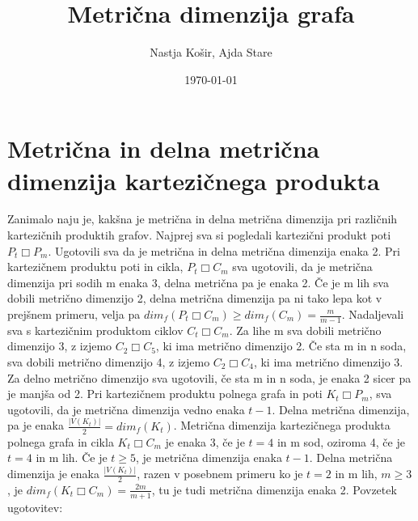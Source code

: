 \documentclass[a4paper]{report}
\title{Metrična dimenzija grafa }
\author{Nastja Košir, Ajda Stare}
\date{\today}
\begin{document}
	\section*{Metrična in delna metrična dimenzija kartezičnega produkta}
	
	Zanimalo naju je, kakšna je metrična in delna metrična dimenzija pri različnih kartezičnih produktih grafov. Najprej sva si pogledali kartezični produkt poti $P_{t}\Box P_{m}$. Ugotovili sva da je metrična in delna metrična dimenzija enaka 2. Pri kartezičnem produktu poti in cikla, $P_{t}\Box C_{m}$ sva ugotovili, da je metrična dimenzija pri  sodih m enaka 3, delna metrična pa je enaka 2. Če je m lih sva dobili metrično dimenzijo 2, delna metrična dimenzija pa ni tako lepa kot v prejšnem primeru, velja pa  $dim_{f}( P_{t}\Box C_{m})\ge dim_{f}(C_{m})= \frac{m}{m-1}$.
	Nadaljevali sva s kartezičnim produktom ciklov $C_{t}\Box C_{m}$. 
	Za lihe m sva dobili metrično dimenzijo 3, z izjemo $C_{2}\Box C_{5}$, ki ima metrično dimenzijo 2. Če sta m in n soda, sva dobili metrično dimenzijo 4, z izjemo $C_{2}\Box C_{4}$, ki ima metrično dimenzijo 3. Za delno metrično dimenzijo sva ugotovili, če sta m in n soda, je enaka 2 sicer pa je manjša od 2. Pri kartezičnem produktu polnega grafa in poti $K_{t}\Box P_{m}$, sva ugotovili, da je metrična dimenzija vedno enaka $t-1$. Delna metrična dimenzija, pa je enaka $\frac{|V(K_{t})|}{2} = dim_{f}(K_{t})$. Metrična dimenzija kartezičnega produkta polnega grafa in cikla $K_{t}\Box C_{m}$ je enaka 3, če je $t = 4$ in m sod, oziroma 4, če je $t = 4$ in m lih. Če je $t \ge 5$, je metrična dimenzija enaka $t-1$. Delna metrična dimenzija je enaka $\frac{|V(K_{t})|}{2}$, razen v posebnem primeru ko je $t = 2$ in m lih, $m \ge 3 $, je $dim_f(K_{t}\Box C_{m}) = \frac{2m}{m+1}$, tu je tudi metrična dimenzija enaka 2.
	Povzetek ugotovitev: 
\end{document}
